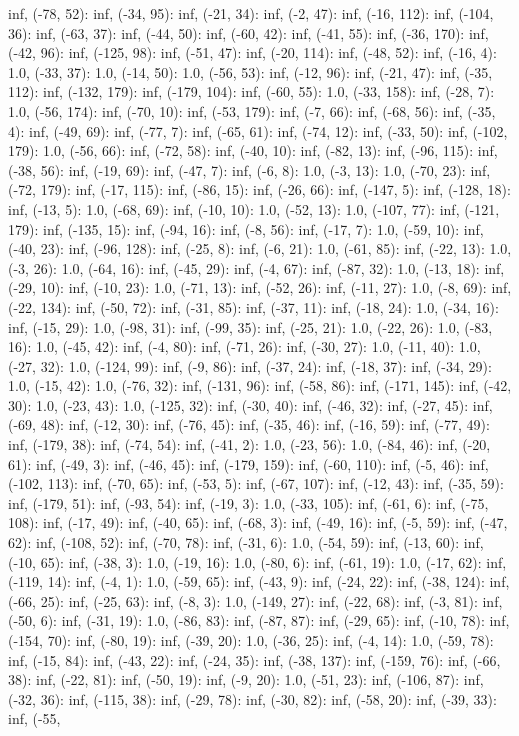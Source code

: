 \documentclass[parskip=half]{scrartcl}
\begin{document}
inf, (-78, 52): inf, (-34, 95): inf, (-21, 34): inf, (-2, 47): inf, (-16, 112): inf, (-104, 36): inf, (-63, 37): inf, (-44, 50): inf, (-60, 42): inf, (-41, 55): inf, (-36, 170): inf, (-42, 96): inf, (-125, 98): inf, (-51, 47): inf, (-20, 114): inf, (-48, 52): inf, (-16, 4): 1.0, (-33, 37): 1.0, (-14, 50): 1.0, (-56, 53): inf, (-12, 96): inf, (-21, 47): inf, (-35, 112): inf, (-132, 179): inf, (-179, 104): inf, (-60, 55): 1.0, (-33, 158): inf, (-28, 7): 1.0, (-56, 174): inf, (-70, 10): inf, (-53, 179): inf, (-7, 66): inf, (-68, 56): inf, (-35, 4): inf, (-49, 69): inf, (-77, 7): inf, (-65, 61): inf, (-74, 12): inf, (-33, 50): inf, (-102, 179): 1.0, (-56, 66): inf, (-72, 58): inf, (-40, 10): inf, (-82, 13): inf, (-96, 115): inf, (-38, 56): inf, (-19, 69): inf, (-47, 7): inf, (-6, 8): 1.0, (-3, 13): 1.0, (-70, 23): inf, (-72, 179): inf, (-17, 115): inf, (-86, 15): inf, (-26, 66): inf, (-147, 5): inf, (-128, 18): inf, (-13, 5): 1.0, (-68, 69): inf, (-10, 10): 1.0, (-52, 13): 1.0, (-107, 77): inf, (-121, 179): inf, (-135, 15): inf, (-94, 16): inf, (-8, 56): inf, (-17, 7): 1.0, (-59, 10): inf, (-40, 23): inf, (-96, 128): inf, (-25, 8): inf, (-6, 21): 1.0, (-61, 85): inf, (-22, 13): 1.0, (-3, 26): 1.0, (-64, 16): inf, (-45, 29): inf, (-4, 67): inf, (-87, 32): 1.0, (-13, 18): inf, (-29, 10): inf, (-10, 23): 1.0, (-71, 13): inf, (-52, 26): inf, (-11, 27): 1.0, (-8, 69): inf, (-22, 134): inf, (-50, 72): inf, (-31, 85): inf, (-37, 11): inf, (-18, 24): 1.0, (-34, 16): inf, (-15, 29): 1.0, (-98, 31): inf, (-99, 35): inf, (-25, 21): 1.0, (-22, 26): 1.0, (-83, 16): 1.0, (-45, 42): inf, (-4, 80): inf, (-71, 26): inf, (-30, 27): 1.0, (-11, 40): 1.0, (-27, 32): 1.0, (-124, 99): inf, (-9, 86): inf, (-37, 24): inf, (-18, 37): inf, (-34, 29): 1.0, (-15, 42): 1.0, (-76, 32): inf, (-131, 96): inf, (-58, 86): inf, (-171, 145): inf, (-42, 30): 1.0, (-23, 43): 1.0, (-125, 32): inf, (-30, 40): inf, (-46, 32): inf, (-27, 45): inf, (-69, 48): inf, (-12, 30): inf, (-76, 45): inf, (-35, 46): inf, (-16, 59): inf, (-77, 49): inf, (-179, 38): inf, (-74, 54): inf, (-41, 2): 1.0, (-23, 56): 1.0, (-84, 46): inf, (-20, 61): inf, (-49, 3): inf, (-46, 45): inf, (-179, 159): inf, (-60, 110): inf, (-5, 46): inf, (-102, 113): inf, (-70, 65): inf, (-53, 5): inf, (-67, 107): inf, (-12, 43): inf, (-35, 59): inf, (-179, 51): inf, (-93, 54): inf, (-19, 3): 1.0, (-33, 105): inf, (-61, 6): inf, (-75, 108): inf, (-17, 49): inf, (-40, 65): inf, (-68, 3): inf, (-49, 16): inf, (-5, 59): inf, (-47, 62): inf, (-108, 52): inf, (-70, 78): inf, (-31, 6): 1.0, (-54, 59): inf, (-13, 60): inf, (-10, 65): inf, (-38, 3): 1.0, (-19, 16): 1.0, (-80, 6): inf, (-61, 19): 1.0, (-17, 62): inf, (-119, 14): inf, (-4, 1): 1.0, (-59, 65): inf, (-43, 9): inf, (-24, 22): inf, (-38, 124): inf, (-66, 25): inf, (-25, 63): inf, (-8, 3): 1.0, (-149, 27): inf, (-22, 68): inf, (-3, 81): inf, (-50, 6): inf, (-31, 19): 1.0, (-86, 83): inf, (-87, 87): inf, (-29, 65): inf, (-10, 78): inf, (-154, 70): inf, (-80, 19): inf, (-39, 20): 1.0, (-36, 25): inf, (-4, 14): 1.0, (-59, 78): inf, (-15, 84): inf, (-43, 22): inf, (-24, 35): inf, (-38, 137): inf, (-159, 76): inf, (-66, 38): inf, (-22, 81): inf, (-50, 19): inf, (-9, 20): 1.0, (-51, 23): inf, (-106, 87): inf, (-32, 36): inf, (-115, 38): inf, (-29, 78): inf, (-30, 82): inf, (-58, 20): inf, (-39, 33): inf, (-55, 
\end{document}
